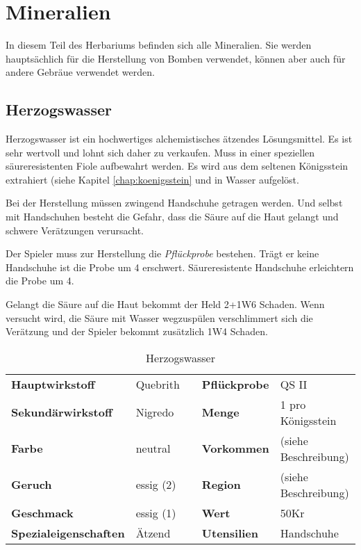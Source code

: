 \section{Mineralien}
In diesem Teil des Herbariums befinden sich alle Mineralien. Sie werden hauptsächlich für die Herstellung von Bomben verwendet, können aber auch für andere Gebräue verwendet werden.


\subsection{Herzogswasser}
Herzogswasser ist ein hochwertiges alchemistisches ätzendes Lösungsmittel. Es ist sehr wertvoll und lohnt sich daher zu verkaufen. Muss in einer speziellen säureresistenten Fiole aufbewahrt werden. Es wird aus dem seltenen Königsstein extrahiert (siehe Kapitel \ref{chap:koenigsstein} und in Wasser aufgelöst. 

Bei der Herstellung müssen zwingend Handschuhe getragen werden. Und selbst mit Handschuhen besteht die Gefahr, dass die Säure auf die Haut gelangt und schwere Verätzungen verursacht. 

Der Spieler muss zur Herstellung die \textit{Pflückprobe} bestehen. Trägt er keine Handschuhe ist die Probe um 4 erschwert. Säureresistente Handschuhe erleichtern die Probe um 4. 

Gelangt die Säure auf die Haut bekommt der Held 2+1W6 Schaden. Wenn versucht wird, die Säure mit Wasser wegzuspülen verschlimmert sich die Verätzung und der Spieler bekommt zusätzlich 1W4 Schaden.

\begin{table}[h] 
\begin{center} 
\begin{tabular}{|l|l|p{1cm}|l|l|} 
  	\cline{1-2} \cline{4-5} 
  	\textbf{Hauptwirkstoff} & Quebrith && \textbf{Pflückprobe} & QS II \\ \cline{1-2} \cline{4-5} 
  	\textbf{Sekundärwirkstoff} & Nigredo && \textbf{Menge} & 1 pro Königsstein \\ \cline{1-2} \cline{4-5} 
  	\textbf{Farbe} & neutral && \textbf{Vorkommen} & (siehe Beschreibung) \\ \cline{1-2} \cline{4-5} 
  	\textbf{Geruch} & essig (2) && \textbf{Region} & (siehe Beschreibung) \\ \cline{1-2} \cline{4-5} 
  	\textbf{Geschmack} & essig (1) && \textbf{Wert} & 50Kr \\ \cline{1-2} \cline{4-5} 
  	\textbf{Spezialeigenschaften} & Ätzend && \textbf{Utensilien} & Handschuhe \\ \cline{1-2} \cline{4-5} 
\end{tabular} 
\end{center} 
\caption{Herzogswasser} 
\label{tab:herzogswasser} 
\end{table}


